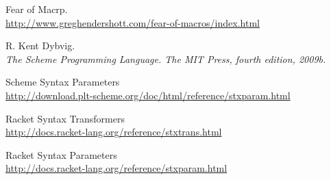\begin{thebibliography}{10}
 Fear of Macrp.\\
\url{http://www.greghendershott.com/fear-of-macros/index.html}

 R. Kent Dybvig.\\
{\it The Scheme Programming Language. The MIT Press, fourth edition, 2009b.}

 Scheme Syntax Parameters\\
\url{http://download.plt-scheme.org/doc/html/reference/stxparam.html}

 Racket Syntax Transformers\\
\url{http://docs.racket-lang.org/reference/stxtrans.html}

 Racket Syntax Parameters\\
\url{http://docs.racket-lang.org/reference/stxparam.html}


\end{thebibliography}
